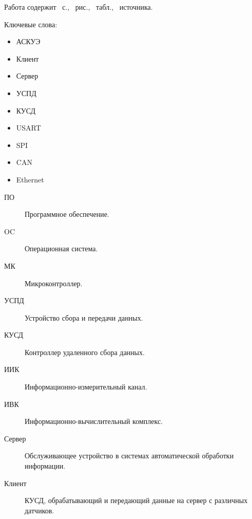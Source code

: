 \documentclass[utf8x,14pt, coursreport]{G7-32}
\begin{document}

\frontmatter %



\Referat %

Работа содержит \totalpages{}~с., \totalfigures{}~рис., \totaltables{}~табл., \totalbibs{}~источника.

Ключевые слова:
\begin{itemize}
\item АСКУЭ
\item Клиент
\item Сервер
\item УСПД
\item КУСД
\item USART
\item SPI
\item CAN
\item Ethernet
\end{itemize}

\tableofcontents

\Abbreviations

\begin{description}
\item[ПО] Программное обеспечение.
\item[OC] Операционная система.
\item[МК] Микроконтроллер.
\item[УСПД] Устройство сбора и передачи данных.
\item[КУСД] Контроллер удаленного сбора данных.
\item[ИИК] Информационно-измерительный канал.
\item[ИВК] Информационно-вычислительный комплекс.
\item[Сервер] Обслуживающее устройство в системах автоматической обработки информации.
\item[Клиент] КУСД, обрабатывающий и передающий данные на сервер с различных датчиков.
\end{description}
\end{document}
